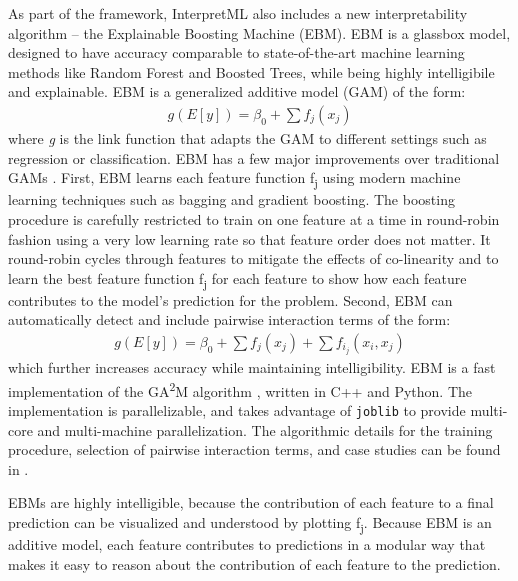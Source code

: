 \documentclass[twoside,11pt]{article}
\begin{document}
As part of the framework, InterpretML also includes a new interpretability algorithm -- the Explainable Boosting Machine (EBM). EBM is a glassbox model, designed to have accuracy comparable to state-of-the-art machine learning methods like Random Forest and Boosted Trees, while being highly intelligibile and explainable. EBM is a generalized additive model (GAM) of the form:
\setlength{\abovedisplayskip}{0pt}%
\setlength{\belowdisplayskip}{0pt}%
\setlength{\abovedisplayshortskip}{0pt}%
\setlength{\belowdisplayshortskip}{0pt}%
\begin{align*}
g(E[y]) = \beta_0 + \sum f_j(x_j)
\end{align*}
\noindent
where \textit{g} is the link function that adapts the GAM to different settings such as regression or classification. EBM has a few major improvements over traditional GAMs \citep{hastie1987generalized}. First, EBM learns each feature function  f\textsubscript{j} using modern machine learning techniques such as bagging and gradient boosting. The boosting procedure is carefully restricted to train on one feature at a time in round-robin fashion using a very low learning rate so that feature order does not matter.  It round-robin cycles through features to mitigate the effects of co-linearity and to learn the best feature function f\textsubscript{j} for each feature to show how each feature contributes to the model's prediction for the problem. Second, EBM can automatically detect and include pairwise interaction terms of the form: 
\setlength{\abovedisplayskip}{0pt}%
\setlength{\belowdisplayskip}{0pt}%
\setlength{\abovedisplayshortskip}{0pt}%
\setlength{\belowdisplayshortskip}{0pt}%
\begin{align*}
g(E[y]) = \beta_0 + \sum f_j(x_j) + \sum f_{i_j}(x_i,x_j)
\end{align*}
which further increases accuracy while maintaining intelligibility. 
EBM is a fast implementation of the GA\textsuperscript{2}M algorithm \citep{LouCGH13}, written in C++ and Python. The implementation is parallelizable, and takes advantage of \texttt{joblib} to provide multi-core and multi-machine parallelization. The algorithmic details for the training procedure, selection of pairwise interaction terms, and case studies can be found in \citep{LouCG12, LouCGH13, caruana2015intelligible}.

EBMs are highly intelligible, because the contribution of each feature to a final prediction can be visualized and understood by plotting f\textsubscript{j}. Because EBM is an additive model, each feature contributes to predictions in a modular way that makes it easy to reason about the contribution of each feature to the prediction. 
\end{document}
